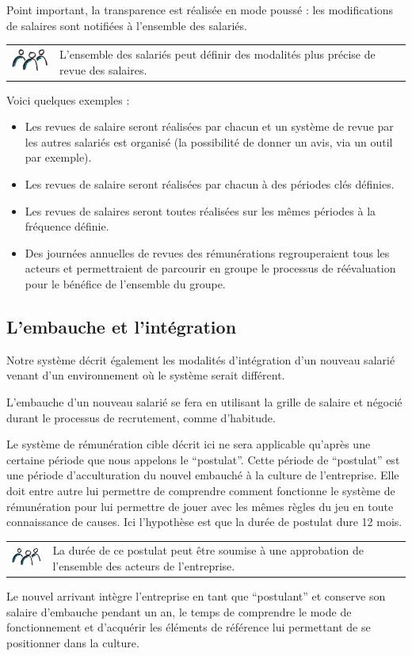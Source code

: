 \documentclass[12pt]{article}
\newcommand{\assemblee}[1]{%
  \begin{tcolorbox}[colframe=DarkPlum,boxrule=2pt,arc=4pt,left=6pt,right=6pt,top=6pt,bottom=6pt,boxsep=0pt,colback=Aluminium1]
    \begin{tabular}{m{1.5cm} m{11cm}}
      \includegraphics[width=1.5cm]{includes/team} & #1 \\
    \end{tabular}
  \end{tcolorbox}
}
\begin{document}
 Point important, la transparence est réalisée en mode poussé : les modifications de salaires sont notifiées à l’ensemble des salariés. 

 \assemblee{L’ensemble des salariés peut définir des modalités plus précise de revue des salaires. }
 Voici quelques exemples :
 \begin{itemize}
   \item Les revues de salaire seront réalisées par chacun et un système de revue par les autres salariés est organisé (la possibilité de donner un avis, via un outil par exemple).
   \item Les revues de salaire seront réalisées par chacun à des périodes clés définies. 
   \item Les revues de salaires seront toutes réalisées sur les mêmes périodes à la fréquence définie.
   \item Des journées annuelles de revues des rémunérations regrouperaient tous les acteurs et permettraient de parcourir en groupe le processus de réévaluation pour le bénéfice de l'ensemble du groupe.
 \end{itemize}

\subsection{L’embauche et l’intégration}

 Notre système décrit également les modalités d’intégration d’un nouveau salarié venant d’un environnement où le système serait différent.

 L’embauche d’un nouveau salarié se fera en utilisant la grille de salaire et négocié durant le processus de recrutement, comme d’habitude. 

 Le système de rémunération cible décrit ici ne sera applicable qu’après une certaine période que nous appelons le “postulat”. Cette période de “postulat” est une période d’acculturation du nouvel embauché à la culture de l’entreprise. Elle doit entre autre lui permettre de comprendre comment fonctionne le système de rémunération pour lui permettre de jouer avec les mêmes règles du jeu en toute connaissance de causes. Ici l’hypothèse est que la durée de postulat dure 12 mois. 

 \assemblee{La durée de ce postulat peut être soumise à une approbation de l’ensemble des acteurs de l’entreprise.}

 Le nouvel arrivant intègre l’entreprise en tant que “postulant” et conserve son salaire d’embauche pendant un an, le temps de comprendre le mode de fonctionnement et d’acquérir les éléments de référence lui permettant de se positionner dans la culture.  
\end{document}
